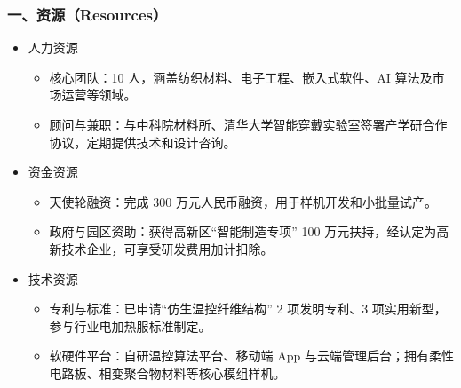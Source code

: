 \documentclass[UTF8]{report}
\theoremstyle{MyLineTheoremStyle} %
\theoremstyle{MyBlockTheoremStyle} %
\theoremstyle{MySubsubsectionStyle} %
\begin{document}
  \subsubsection{一、资源（Resources）}
    \begin{itemize}
      \item 人力资源
        \begin{itemize}
          \item 核心团队：10 人，涵盖纺织材料、电子工程、嵌入式软件、AI 算法及市场运营等领域。  
          \item 顾问与兼职：与中科院材料所、清华大学智能穿戴实验室签署产学研合作协议，定期提供技术和设计咨询。
        \end{itemize}
      \item 资金资源
        \begin{itemize}
          \item 天使轮融资：完成 300 万元人民币融资，用于样机开发和小批量试产。  
          \item 政府与园区资助：获得高新区“智能制造专项” 100 万元扶持，经认定为高新技术企业，可享受研发费用加计扣除。
        \end{itemize}
      \item 技术资源
        \begin{itemize}
          \item 专利与标准：已申请“仿生温控纤维结构” 2 项发明专利、3 项实用新型，参与行业电加热服标准制定。  
          \item 软硬件平台：自研温控算法平台、移动端 App 与云端管理后台；拥有柔性电路板、相变聚合物材料等核心模组样机。
        \end{itemize}
    \end{itemize}
\end{document}
